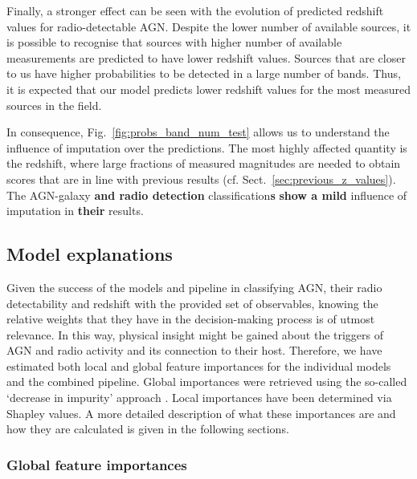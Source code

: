 \documentclass{aa}
\begin{document}
Finally, a stronger effect can be seen with the evolution of predicted redshift values for radio-detectable AGN. Despite the lower number of available sources, it is possible to recognise that sources with higher number of available measurements are predicted to have lower redshift values. Sources that are closer to us have higher probabilities to be detected in a large number of bands. Thus, it is expected that our model predicts lower redshift values for the most measured sources in the field.

In consequence, Fig.~\ref{fig:probs_band_num_test} allows us to understand the influence of imputation over the predictions. The most highly affected quantity is the redshift, where large fractions of measured magnitudes are needed to obtain scores that are in line with previous results (cf. Sect.~\ref{sec:previous_z_values}). The AGN-galaxy \textbf{and radio detection} classification\textbf{s} \textbf{show a mild} influence of imputation in \textbf{their} results.

\subsection{Model explanations}\label{sec:model_explain}

Given the success of the models and pipeline in classifying AGN, their radio detectability and redshift with the provided set of observables, knowing the relative weights that they have in the decision-making process is of utmost relevance. In this way, physical insight might be gained about the triggers of AGN and radio activity and its connection to their host.
Therefore, we have estimated both local and global feature importances for the individual models and the combined pipeline. Global importances were retrieved using the so-called `decrease in impurity' approach \citep[see, for example,][]{Breiman2001}. Local importances have been determined via Shapley values. A more detailed description of what these importances are and how they are calculated is given in the following sections.

\subsubsection{Global feature importances}\label{sec:feat_importances}
\end{document}
